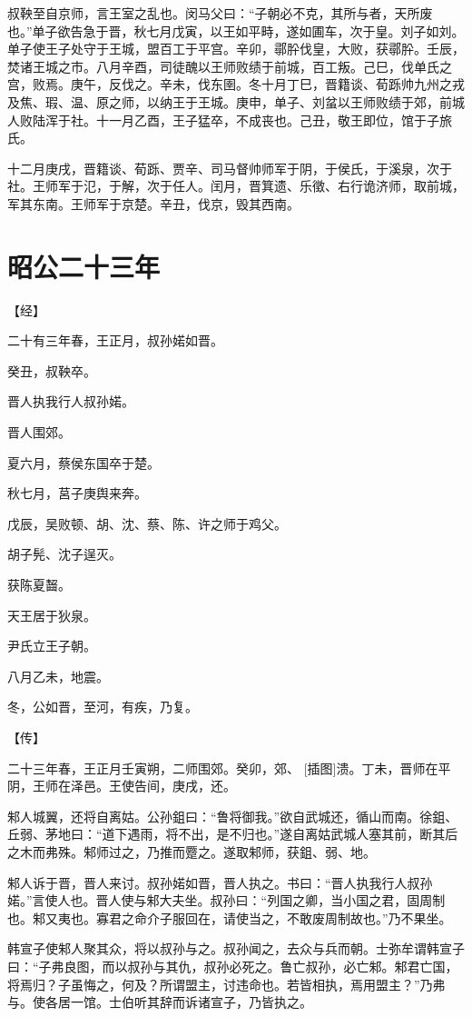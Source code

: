 \documentclass[a4paper,12pt,UTF8,twoside]{ctexbook}
\begin{document}
叔鞅至自京师，言王室之乱也。闵马父曰：“子朝必不克，其所与者，天所废也。”单子欲告急于晋，秋七月戊寅，以王如平畤，遂如圃车，次于皇。刘子如刘。单子使王子处守于王城，盟百工于平宫。辛卯，鄩肸伐皇，大败，获鄩肸。壬辰，焚诸王城之市。八月辛酉，司徒醜以王师败绩于前城，百工叛。己巳，伐单氏之宫，败焉。庚午，反伐之。辛未，伐东圉。冬十月丁巳，晋籍谈、荀跞帅九州之戎及焦、瑕、温、原之师，以纳王于王城。庚申，单子、刘蚠以王师败绩于郊，前城人败陆浑于社。十一月乙酉，王子猛卒，不成丧也。己丑，敬王即位，馆于子旅氏。

十二月庚戌，晋籍谈、荀跞、贾辛、司马督帅师军于阴，于侯氏，于溪泉，次于社。王师军于氾，于解，次于任人。闰月，晋箕遗、乐徵、右行诡济师，取前城，军其东南。王师军于京楚。辛丑，伐京，毁其西南。


\section{昭公二十三年}




【经】

二十有三年春，王正月，叔孙婼如晋。

癸丑，叔鞅卒。

晋人执我行人叔孙婼。

晋人围郊。

夏六月，蔡侯东国卒于楚。

秋七月，莒子庚舆来奔。

戊辰，吴败顿、胡、沈、蔡、陈、许之师于鸡父。

胡子髡、沈子逞灭。

获陈夏齧。

天王居于狄泉。

尹氏立王子朝。

八月乙未，地震。

冬，公如晋，至河，有疾，乃复。

【传】

二十三年春，王正月壬寅朔，二师围郊。癸卯，郊、 [插图]溃。丁未，晋师在平阴，王师在泽邑。王使告间，庚戌，还。

邾人城翼，还将自离姑。公孙鉏曰：“鲁将御我。”欲自武城还，循山而南。徐鉏、丘弱、茅地曰：“道下遇雨，将不出，是不归也。”遂自离姑武城人塞其前，断其后之木而弗殊。邾师过之，乃推而蹷之。遂取邾师，获鉏、弱、地。

邾人诉于晋，晋人来讨。叔孙婼如晋，晋人执之。书曰：“晋人执我行人叔孙婼。”言使人也。晋人使与邾大夫坐。叔孙曰：“列国之卿，当小国之君，固周制也。邾又夷也。寡君之命介子服回在，请使当之，不敢废周制故也。”乃不果坐。

韩宣子使邾人聚其众，将以叔孙与之。叔孙闻之，去众与兵而朝。士弥牟谓韩宣子曰：“子弗良图，而以叔孙与其仇，叔孙必死之。鲁亡叔孙，必亡邾。邾君亡国，将焉归？子虽悔之，何及？所谓盟主，讨违命也。若皆相执，焉用盟主？”乃弗与。使各居一馆。士伯听其辞而诉诸宣子，乃皆执之。
\end{document}
